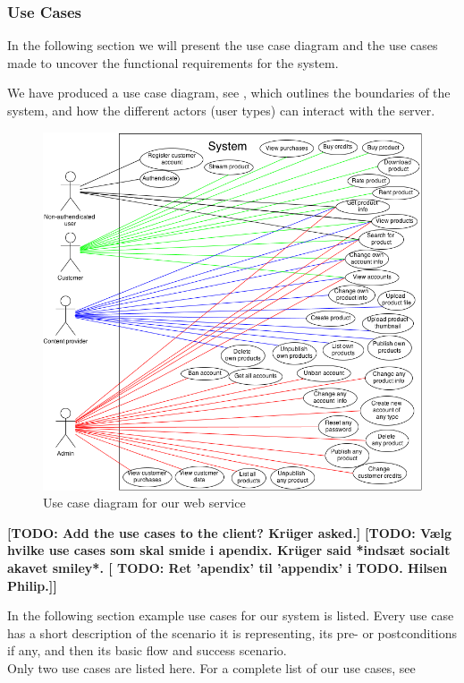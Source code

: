 \subsubsection{Use Cases}
In the following section we will present the use case diagram and the use cases made to uncover the functional requirements for the system.

We have produced a use case diagram, see , which outlines the boundaries of the system, and how the different actors (user types) can interact with the server. 
\begin{figure}[h]
\centering
\includegraphics[scale=0.5]{illustrations/UseCaseDiagram.png}
\caption{Use case diagram for our web service}
\label{useCaseImg}
\end{figure}

\textbf{[TODO: Add the use cases to the client? Krüger asked.]}
\textbf{[TODO: Vælg hvilke use cases som skal smide i apendix. Krüger said *indsæt socialt akavet smiley*. [ TODO: Ret 'apendix' til 'appendix' i TODO. Hilsen Philip.]]}

In the following section example use cases for our system is listed. Every use case has a short description of the scenario it is representing, its pre- or postconditions if any, and then its basic flow and success scenario.\\
Only two use cases are listed here. For a complete list of our use cases, see 

